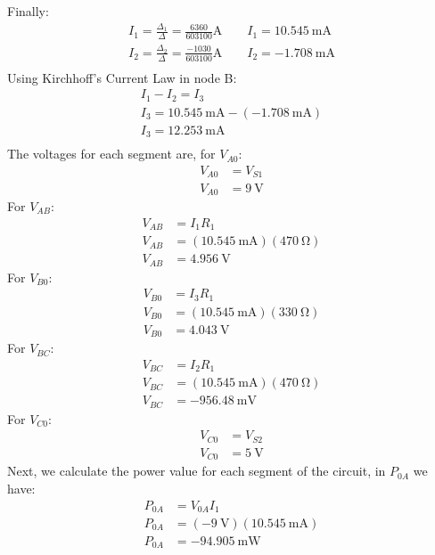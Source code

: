 \documentclass[a4paper]{article}
\begin{document}
Finally:
\begin{gather*}
    I_1=\frac{\Delta_1}{\Delta}=\frac{6360}{603100}\si{\ampere}\qquad I_1=\SI{10.545}{\milli\ampere}\\[2ex]
    I_2=\frac{\Delta_2}{\Delta}=\frac{-1030}{603100}\si{\ampere}\qquad I_2=\SI{-1.708}{\milli\ampere}\\
\end{gather*}
Using Kirchhoff's Current Law in node B:
\begin{gather*}
I_1-I_2=I_3\\
I_3=\SI{10.545}{\milli\ampere}-(\SI{-1.708}{\milli\ampere})\\
I_3=\SI{12.253}{\milli\ampere}\\
\end{gather*}
The voltages for each segment are, for $V_{A0}$:
\begin{align*}
    V_{A0}&=V_{S1}\\
    V_{A0}&=\SI{9}{\volt}
\end{align*}
For $V_{AB}$:
\begin{align*}
    V_{AB}&=I_1R_1\\
    V_{AB}&=(\SI{10.545}{\milli\ampere})(\SI{470}{\ohm})\\
    V_{AB}&=\SI{4.956}{\volt}
\end{align*}
For $V_{B0}$:
\begin{align*}
    V_{B0}&=I_3R_1\\
    V_{B0}&=(\SI{10.545}{\milli\ampere})(\SI{330}{\ohm})\\
    V_{B0}&=\SI{4.043}{\volt}
\end{align*}
For $V_{BC}$:
\begin{align*}
    V_{BC}&=I_2R_1\\
    V_{BC}&=(\SI{10.545}{\milli\ampere})(\SI{470}{\ohm})\\
    V_{BC}&=\SI{-956.48}{\milli\volt}
\end{align*}
For $V_{C0}$:
\begin{align*}
    V_{C0}&=V_{S2}\\
    V_{C0}&=\SI{5}{\volt}
\end{align*}
Next, we calculate the power value for each segment of the circuit, in $P_{0A}$ we have:
\begin{align*}
    P_{0A}&=V_{0A}I_1\\
    P_{0A}&=(-\SI{9}{\volt})(\SI{10.545}{\milli\ampere})\\
    P_{0A}&=\SI{-94.905}{\milli\watt}
\end{align*}
\end{document}
